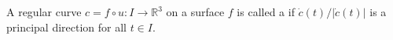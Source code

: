 A regular curve $c = f \circ u: I \to \mathbb{R}^3$ on a surface $f$ is called a  if $\dot{c}(t)/|\dot{c}(t)|$ is a principal direction for all $t \in I$.
